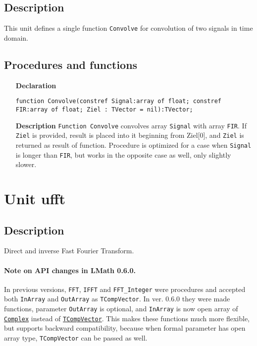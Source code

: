 \documentclass[12pt,a4paper,oneside]{report}
\newcommand{\declarationitem}[1]{\textbf{#1}}
\newcommand{\descriptiontitle}[1]{\textbf{#1}}
\newcommand{\code}[1]{\texttt{#1}}
\begin{document}
\subsection{Description}
This unit defines a single function \code{Convolve} for convolution of two signals in time domain.
\subsection{Procedures and functions}
\label{uconvolutions-convolve}
\begin{itemize}
	\item[\declarationitem{Declaration}\hfill]
	\begin{flushleft}
	\code{function Convolve(constref Signal:array of float; constref FIR:array of float; Ziel : TVector = nil):TVector;}	
	\end{flushleft}
	\item[\descriptiontitle{Description}]
	\code{Function Convolve} convolves array \code{Signal} with array \code{FIR}. If \code{Ziel} is provided, result is placed into it beginning from Ziel[0], and \code{Ziel} is returned as result of function. Procedure is optimized for a case when \code{Signal} is longer than \code{FIR}, but works in the opposite case as well, only slightly slower. 
\end{itemize}	

\section{Unit ufft}
\label{ufft}
\subsection{Description}
Direct and inverse Fast Fourier Transform.

\paragraph*{Note on API changes in LMath 0.6.0.} In previous versions, \code{FFT}, \code{IFFT} and \code{FFT{\_}Integer} were procedures and accepted both \code{InArray} and \code{OutArray} as \code{TCompVector}. In ver. 0.6.0 they were made functions, parameter \code{OutArray} is optional, and \code{InArray} is now open array of \hyperref[utypes-complex]{\code{Complex}}  instead of \hyperref[utypes-TCompVector]{\code{TCompVector}}. This makes these functions much more flexible, but supports backward compatibility, because when formal parameter has open array type, \code{TCompVector} can be passed as well.
\end{document}
